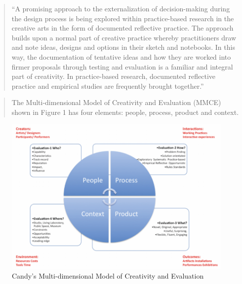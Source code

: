 \begin{quote}
  ``A promising approach to the externalization of decision-making during the design process is being explored within practice-based research in the creative arts in the form of documented reflective practice. The approach builds upon a normal part of creative practice whereby practitioners draw and note ideas, designs and options in their sketch and notebooks. In this way, the documentation of tentative ideas and how they are worked into firmer proposals through testing and evaluation is a familiar and integral part of creativity. In practice-based research, documented reflective practice and empirical studies are frequently brought together.'' \parencite[p.10]{Candy2012}
\end{quote}

\begin{quote}
  The Multi-dimensional Model of Creativity and Evaluation (MMCE) shown in Figure 1 has four elements: people, process, product and context. \parencite[p.11]{Candy2012}
\end{quote}

\begin{figure}[htb] %
  \centering
  \includegraphics[width=\linewidth]{images/candy02.png}
\caption[Multi-dimensional Model of Creativity and Evaluation]{Candy's Multi-dimensional Model of Creativity and Evaluation}
\label{fig:candy02}
\end{figure}

